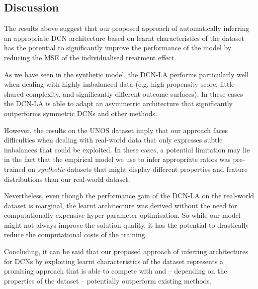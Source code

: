 \subsection{Discussion}
The results above suggest that our proposed approach of automatically inferring an appropriate DCN architecture based on learnt characteristics of the dataset has the potential to significantly improve the performance of the model by reducing the MSE of the individualised treatment effect. 

As we have seen in the synthetic model, the DCN-LA performs particularly well when dealing with highly-imbalanced data (e.g. high propensity score, little shared complexity, and significantly different outcome surfaces). In these cases the DCN-LA is able to adapt an asymmetric architecture that significantly outperforms symmetric DCNs and other methods. 

However, the results on the UNOS dataset imply that our approach faces difficulties when dealing with real-world data that only expresses subtle imbalances that could be exploited. In these cases, a potential limitation may lie in the fact that the empirical model we use to infer appropriate ratios was pre-trained on \emph{synthetic} datasets that might display different properties and feature distributions than our real-world dataset. 

Nevertheless, even though the performance gain of the DCN-LA on the real-world dataset is marginal, the learnt architecture was derived without the need for computationally expensive hyper-parameter optimisation. So while our model might not always improve the solution quality, it has the potential to drastically reduce the computational costs of the training. 

Concluding, it can be said that our proposed approach of inferring architectures for DCNs by exploiting learnt characteristics of the dataset represents a promising approach that is able to compete with and -- depending on the properties of the dataset -- potentially outperform existing methods. 
